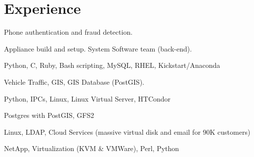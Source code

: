 \documentclass[letterpaper]{cvitae}
\begin{document}
\begin{minipage}[t]{0.66\textwidth}
\section{Experience}

\vspace{\topsep} %
\begin{tightitemize}
\item Phone authentication and fraud detection.
\item Appliance build and setup. System Software team (back-end).
\item Python, C, Ruby, Bash scripting, MySQL, RHEL, Kickstart/Anaconda
\end{tightitemize}

\sectionspace

\begin{tightitemize}
\item Vehicle Traffic, GIS, GIS Database (PostGIS).
\item Python, IPCs, Linux, Linux Virtual Server, HTCondor
\item Postgres with PostGIS, GFS2
\end{tightitemize}

\sectionspace

\vspace{\topsep} %
\begin{tightitemize}
\item Linux, LDAP, Cloud Services (massive virtual disk and email for 90K customers)
\item NetApp, Virtualization (KVM \& VMWare), Perl, Python
\end{tightitemize}

\sectionspace



\end{minipage}
\end{document}
